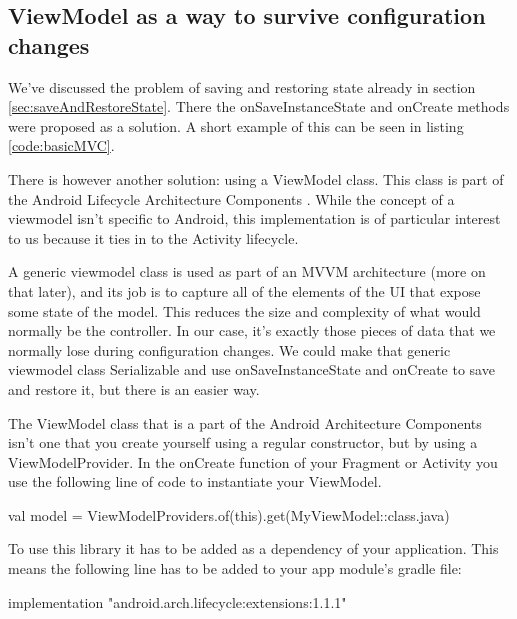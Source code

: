 \subsection{ViewModel as a way to survive configuration changes}
We've discussed the problem of saving and restoring state already in section \ref{sec:saveAndRestoreState}. 
There the onSaveInstanceState and onCreate methods were proposed as a solution.
A short example of this can be seen in listing \ref{code:basicMVC}.



There is however another solution: using a ViewModel class.
This class is part of the Android Lifecycle Architecture Components \cite{viewModelOfficial}.
While the concept of a viewmodel isn't specific to Android, this implementation is of particular interest to us because it ties in to the Activity lifecycle.

A generic viewmodel class is used as part of an MVVM architecture (more on that later), and its job is to capture all of the elements of the UI that expose some state of the model.
This reduces the size and complexity of what would normally be the controller.
In our case, it's exactly those pieces of data that we normally lose during configuration changes.
We could make that generic viewmodel class Serializable and use onSaveInstanceState and onCreate to save and restore it, but there is an easier way. 

The ViewModel class that is a part of the Android Architecture Components isn't one that you create yourself using a regular constructor, but by using a ViewModelProvider\cite{viewModelProvider}.
In the onCreate function of your Fragment or Activity you use the following line of code to instantiate your ViewModel.
\begin{android}
	val model = ViewModelProviders.of(this).get(MyViewModel::class.java)	
\end{android}
To use this library it has to be added as a dependency of your application.
This means the following line has to be added to your app module's gradle file:
\begin{android}
	    implementation "android.arch.lifecycle:extensions:1.1.1"
\end{android}

